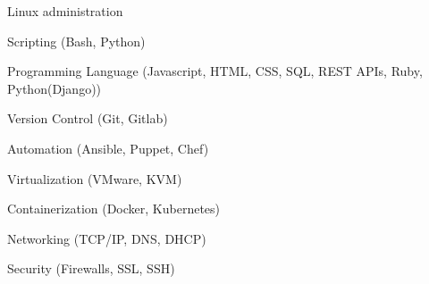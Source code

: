 \begin{cventries}
  \cventry
    { } %
    { } %
    { } %
    { } %
    {
      \begin{cvitems} %
        \item {Linux administration}
        \item {Scripting (Bash, Python)}
        \item {Programming Language (Javascript, HTML, CSS, SQL, REST APIs, Ruby, Python(Django))}
        \item {Version Control (Git, Gitlab)}
        \item {Automation (Ansible, Puppet, Chef)}
        \item {Virtualization (VMware, KVM)}
        \item {Containerization (Docker, Kubernetes)}
        \item {Networking (TCP/IP, DNS, DHCP)}
        \item {Security (Firewalls, SSL, SSH)}
      \end{cvitems}
    }


\end{cventries}
